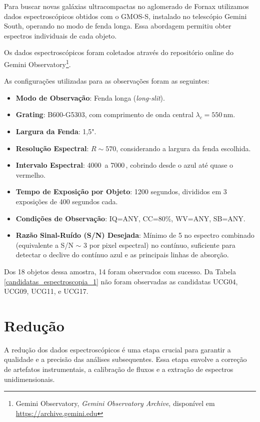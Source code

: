 Para buscar novas galáxias ultracompactas no aglomerado de Fornax utilizamos dados espectroscópicos obtidos com o \ac{GMOS-S}, instalado no telescópio Gemini South, operando no modo de fenda longa. Essa abordagem permitiu obter espectros individuais de cada objeto.

Os dados espectroscópicos foram coletados através do repositório online do Gemini Observatory\footnote{Gemini Observatory, \textit{Gemini Observatory Archive}, disponível em \url{https://archive.gemini.edu}}.

As configurações utilizadas para as observações foram as seguintes:

\begin{itemize}
    \item \textbf{Modo de Observação}: Fenda longa (\textit{long-slit}).
    \item \textbf{Grating}: B600-G5303, com comprimento de onda central $\lambda_c = 550 \, \text{nm}$.
    \item \textbf{Largura da Fenda}: 1,5".
    \item \textbf{Resolução Espectral}: $R \sim 570$, considerando a largura da fenda escolhida.
    \item \textbf{Intervalo Espectral}: 4000\, a 7000\,, cobrindo desde o azul até quase o vermelho.
    \item \textbf{Tempo de Exposição por Objeto}: 1200 segundos, divididos em 3 exposições de 400 segundos cada.
    \item \textbf{Condições de Observação}: IQ=ANY, CC=80\%, WV=ANY, SB=ANY.
    \item \textbf{Razão Sinal-Ruído (S/N) Desejada}: Mínimo de 5 no espectro combinado (equivalente a S/N $\sim$ 3 por pixel espectral) no contínuo, suficiente para detectar o declive do contínuo azul e as principais linhas de absorção.
\end{itemize}

Dos 18 objetos dessa amostra, 14 foram observados com sucesso. Da Tabela \ref{candidatas_espectroscopia_1} não foram observadas as candidatas UCG04, UCG09, UCG11, e UCG17.

\section{Redução}\label{sec:reducao}
A redução dos dados espectroscópicos é uma etapa crucial para garantir a qualidade e a precisão das análises subsequentes. Essa etapa envolve a correção de artefatos instrumentais, a calibração de fluxos e a extração de espectros unidimensionais.

